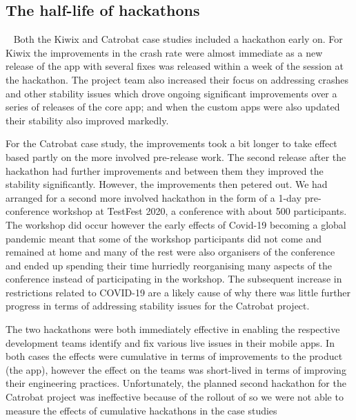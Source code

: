 \subsection{The half-life of hackathons}~\label{discussion-half-life-of-hackathons}
Both the Kiwix and Catrobat case studies included a hackathon early on. For Kiwix the improvements in the crash rate were almost immediate as a new release of the app with several fixes was released within a week of the session at the hackathon. The project team also increased their focus on addressing crashes and other stability issues which drove ongoing significant improvements over a series of releases of the core app; and when the custom apps were also updated their stability also improved markedly. %

For the Catrobat case study, the improvements took a bit longer to take effect based partly on the more involved pre-release work. The second release after the hackathon had further improvements and between them they improved the stability significantly. %
However, the improvements then petered out. We had arranged for a second more involved hackathon in the form of a 1-day pre-conference workshop at TestFest 2020, a conference with about 500 participants. %
The workshop did occur however the early effects of Covid-19 becoming a global pandemic meant that some of the workshop participants did not come and remained at home and many of the rest were also organisers of the conference and ended up spending their time hurriedly reorganising many aspects of the conference instead of participating in the workshop. The subsequent increase in restrictions related to COVID-19 are a likely cause of why there was little further progress in terms of addressing stability issues for the Catrobat project.

The two hackathons were both immediately effective in enabling the respective development teams identify and fix various live issues in their mobile apps. In both cases the effects were cumulative in terms of improvements to the product (the app), however the effect on the teams was short-lived in terms of improving their engineering practices. Unfortunately, the planned second hackathon for the Catrobat project was ineffective because of the rollout of  so we were not able to measure the effects of cumulative hackathons in the case studies~

